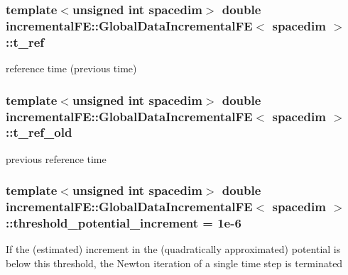 \subsubsection[{\texorpdfstring{t\+\_\+ref}{t_ref}}]{\setlength{\rightskip}{0pt plus 5cm}template$<$unsigned int spacedim$>$ double {\bf incremental\+F\+E\+::\+Global\+Data\+Incremental\+FE}$<$ spacedim $>$\+::t\+\_\+ref\hspace{0.3cm}{\ttfamily [private]}}\hypertarget{classincremental_f_e_1_1_global_data_incremental_f_e_a6ddf751a2f8abff9353d12e469e38f96}{}\label{classincremental_f_e_1_1_global_data_incremental_f_e_a6ddf751a2f8abff9353d12e469e38f96}
reference time (previous time) 
\subsubsection[{\texorpdfstring{t\+\_\+ref\+\_\+old}{t_ref_old}}]{\setlength{\rightskip}{0pt plus 5cm}template$<$unsigned int spacedim$>$ double {\bf incremental\+F\+E\+::\+Global\+Data\+Incremental\+FE}$<$ spacedim $>$\+::t\+\_\+ref\+\_\+old\hspace{0.3cm}{\ttfamily [private]}}\hypertarget{classincremental_f_e_1_1_global_data_incremental_f_e_ad808aad6cdbfa6eddad05fb85c056d11}{}\label{classincremental_f_e_1_1_global_data_incremental_f_e_ad808aad6cdbfa6eddad05fb85c056d11}
previous reference time 
\subsubsection[{\texorpdfstring{threshold\+\_\+potential\+\_\+increment}{threshold_potential_increment}}]{\setlength{\rightskip}{0pt plus 5cm}template$<$unsigned int spacedim$>$ double {\bf incremental\+F\+E\+::\+Global\+Data\+Incremental\+FE}$<$ spacedim $>$\+::threshold\+\_\+potential\+\_\+increment = 1e-\/6\hspace{0.3cm}{\ttfamily [private]}}\hypertarget{classincremental_f_e_1_1_global_data_incremental_f_e_a2f7adb8b4f7f8875715e1dbd0edd9ac8}{}\label{classincremental_f_e_1_1_global_data_incremental_f_e_a2f7adb8b4f7f8875715e1dbd0edd9ac8}
If the (estimated) increment in the (quadratically approximated) potential is below this threshold, the Newton iteration of a single time step is terminated 
